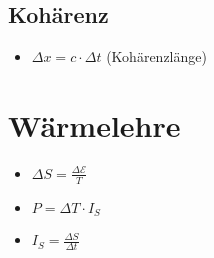 \documentclass[paper = a4, twocolumn]{scrartcl}
\DeclareRobustCommand{\E}{\mathcal{E}}
\begin{document}
\subsection{Kohärenz}
\begin{itemize}
\item
	\( \Delta x = c \cdot \Delta t \) (Kohärenzlänge)
\end{itemize}

\section{Wärmelehre}
\begin{itemize}
\item
	\( \Delta S = \frac{\Delta \E}{T} \)
\item
	\( P = \Delta T \cdot I_S \)
\item
	\( I_S = \frac{\Delta S}{\Delta t} \)
\end{itemize}
\end{document}
